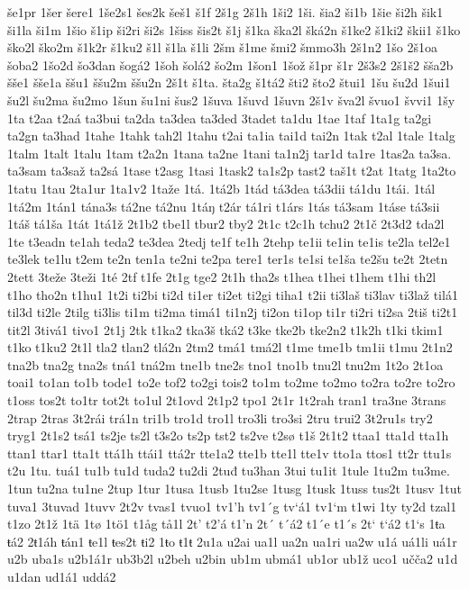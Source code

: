 še1pr
1šer
šere1
1še2s1
šes2k
šeš1
š1f
2š1g
2š1h
1ši2
1ši.
šia2
ši1b
1šie
ši2h
šik1
ši1la
ši1m
1šio
š1ip
ši2ri
ši2s
1šiss
šis2t
š1j
š1ka
ška2l
šká2n
š1ke2
š1ki2
škii1
š1ko
ško2l
ško2m
š1k2r
š1ku2
š1l
š1la
š1li
2šm
š1me
šmi2
šmmo3h
2š1n2
1šo
2š1oa
šoba2
1šo2d
šo3dan
šogá2
1šoh
šolá2
šo2m
1šon1
1šož
š1pr
š1r
2š3s2
2š1š2
šša2b
šše1
šše1a
ššu1
ššu2m
ššu2n
2š1t
š1ta.
šta2g
š1tá2
šti2
što2
štui1
1šu
šu2d
1šui1
šu2l
šu2ma
šu2mo
1šun
šu1ni
šus2
1šuva
1šuvd
1šuvn
2š1v
šva2l
švuo1
švvi1
1šy
1ta
t2aa
t2aá
ta3bui
ta2da
ta3dea
ta3ded
3tadet
ta1du
1tae
1taf
1ta1g
ta2gi
ta2gn
ta3had
1tahe
1tahk
tah2l
1tahu
t2ai
ta1ia
tai1d
tai2n
1tak
t2al
1tale
1talg
1talm
1talt
1talu
1tam
t2a2n
1tana
ta2ne
1tani
ta1n2j
tar1d
ta1re
1tas2a
ta3sa.
ta3sam
ta3saž
ta2sá
1tase
t2asg
1tasi
1task2
ta1s2p
tast2
taš1t
t2at
1tatg
1ta2to
1tatu
1tau
2ta1ur
1ta1v2
1taže
1tá.
1tá2b
1tád
tá3dea
tá3dii
tá1du
1tái.
1tál
1tá2m
1tán1
tána3s
tá2ne
tá2nu
1táŋ
t2ár
tá1ri
t1árs
1tás
tá3sam
1táse
tá3sii
1táš
tá1ša
1tát
1tá1ž
2t1b2
tbe1l
tbur2
tby2
2t1c
t2c1h
tchu2
2t1č
2t3d2
tda2l
1te
t3eadn
te1ah
teda2
te3dea
2tedj
te1f
te1h
2tehp
te1ii
te1in
te1is
te2la
tel2e1
te3lek
te1lu
t2em
te2n
ten1a
te2ni
te2pa
tere1
ter1s
te1si
te1ša
te2šu
te2t
2tetn
2tett
3teže
3teži
1té
2tf
t1fe
2t1g
tge2
2t1h
tha2s
t1hea
t1hei
t1hem
t1hi
th2l
t1ho
tho2n
t1hu1
1t2i
ti2bi
ti2d
ti1er
ti2et
ti2gi
tiha1
t2ii
ti3laš
ti3lav
ti3laž
tilá1
til3d
ti2le
2tilg
ti3lis
ti1m
ti2ma
timá1
ti1n2j
ti2on
ti1op
ti1r
ti2ri
ti2sa
2tiš
ti2t1
tit2l
3tivá1
tivo1
2t1j
2tk
t1ka2
tka3š
tká2
t3ke
tke2b
tke2n2
t1k2h
t1ki
tkim1
t1ko
t1ku2
2t1l
tla2
tlan2
tlá2n
2tm2
tmá1
tmá2l
t1me
tme1b
tm1ii
t1mu
2t1n2
tna2b
tna2g
tna2s
tná1
tná2m
tne1b
tne2s
tno1
tno1b
tnu2l
tnu2m
1t2o
2t1oa
toai1
to1an
to1b
tode1
to2e
tof2
to2gi
tois2
to1m
to2me
to2mo
to2ra
to2re
to2ro
t1oss
tos2t
to1tr
tot2t
to1ul
2t1ovd
2t1p2
tpo1
2t1r
1t2rah
tran1
tra3ne
3trans
2trap
2tras
3t2rái
trá1n
tri1b
tro1d
tro1l
tro3li
tro3si
2tru
trui2
3t2ru1s
try2
tryg1
2t1s2
tsá1
ts2je
ts2l
t3s2o
ts2p
tst2
ts2ve
t2sø
t1š
2t1t2
ttaa1
tta1d
tta1h
ttan1
ttar1
tta1t
ttá1h
ttái1
ttá2r
tte1a2
tte1b
tte1l
tte1v
tto1a
ttos1
tt2r
ttu1s
t2u
1tu.
tuá1
tu1b
tu1d
tuda2
tu2di
2tuđ
tu3han
3tui
tu1it
1tule
1tu2m
tu3me.
1tun
tu2na
tu1ne
2tup
1tur
1tusa
1tusb
1tu2se
1tusg
1tusk
1tuss
tus2t
1tusv
1tut
tuva1
3tuvad
1tuvv
2t2v
tvas1
tvuo1
tv1'h
tv1´g
tv`á1
tv1`m
t1wi
1ty
ty2d
tzal1
t1zo
2t1ž
1tä
1tø
1tö1
t1åg
tå1l
2t'
t2'á
t1'n
2t´
t´á2
t1´e
t1´s
2t`
t`á2
t1`s
1ŧa
ŧá2
2ŧ1áh
ŧán1
ŧe1l
ŧes2t
ŧi2
1ŧo
ŧ1ŧ
2u1a
u2ai
ua1l
ua2n
ua1ri
ua2w
u1á
uá1li
uá1r
u2b
uba1s
u2b1á1r
ub3b2l
u2beh
u2bin
ub1m
ubmá1
ub1or
ub1ž
uco1
učča2
u1d
u1dan
ud1á1
uddá2
